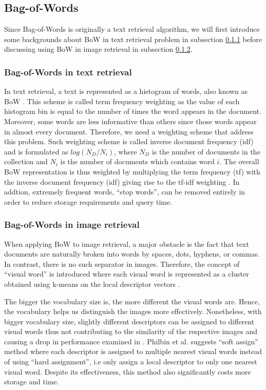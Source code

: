 \subsection{Bag-of-Words}\label{section:background_bow}

Since Bag-of-Words is originally a text retrieval algorithm, we will first introduce some backgrounds about BoW in text retrieval problem in subsection \ref{section:bow_text} before discussing using BoW in image retrieval in subsection \ref{section:bow_image}.

\subsubsection{Bag-of-Words in text retrieval}\label{section:bow_text}
In text retrieval, a text is represented as a histogram of words, also known as BoW \cite{4}. This scheme is called term frequency weighting as the value of each histogram bin is equal to the number of times the word appears in the document.
Moreover, some words are less informative than others since those words appear in almost every document. Therefore, we need a weighting scheme that address this problem. Such weighting scheme is called inverse document frequency (idf) and is formulated as $log(N_{D} / N_{i})$, where $N_{D}$ is the number of documents in the collection and $N_{i}$ is the number of documents which contains word $i$. The overall BoW representation is thus weighted by multiplying the term frequency (tf) with the inverse document frequency (idf) giving rise to the tf-idf weighting \cite{4}. In addtion, extremely frequent words, ``stop words'', can be removed entirely in order to reduce storage requirements and query time.


\subsubsection{Bag-of-Words in image retrieval} \label{section:bow_image}

When applying BoW to image retrieval, a major obstacle is the fact that text documents are naturally broken into words by spaces, dots, hyphens, or commas. In contrast, there is no such separator in images. Therefore, the concept of ``visual word'' is introduced where each visual word is represented as a cluster obtained using k-means on the local descriptor vectors \cite{3}.

The bigger the vocabulary size is, the more different the visual words are. Hence, the vocabulary helps us distinguish the images more effectively. Nonetheless, with bigger vocabulary size, slightly different descriptors can be assigned to different visual words thus not contributing to the similarity of the respective images and causing a drop in performance examined in \cite{5, 6, 7}. Philbin et al. \cite{7} suggests ``soft assign'' method where each descriptor is assigned to multiple nearest visual words instead of using ``hard assignment'', i.e only assign a local descriptor to only one nearest visual word. Despite its effectiveness, this method also significantly costs more storage and time.



